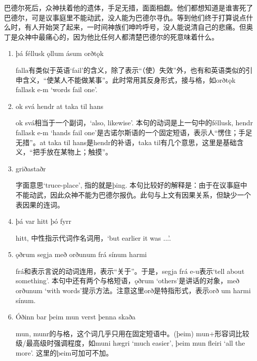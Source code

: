 \begin{translation*}{}
    巴德尔死后，众神扶着他的遗体，手足无措，面面相觑。他们都想知道是谁害死了巴德尔，可是议事庭里不能动武，没人能为巴德尔寻仇。等到他们终于打算说点什么时，有人开始哭了起来，一时间神族们呻吟呼号，没人能说清自己的悲痛。但奥丁是众神中最痛心的，因为他比任何人都清楚巴德尔的死意味着什么。
\end{translation*}
\begin{grammar*}{}
    \begin{enumerate}[leftmargin=*]
        \item þá féllusk ǫllum ásum orðtǫk

              falla有类似于英语`fail'的含义，除了表示“（使）失效”外，也有和英语类似的引申含义，“使某人不能做某事”。此时常用其反身形式，接与格，如orðtǫk fallask e-m `words fail one'.

        \item ok svá hendr at taka til hans

              ok svá相当于一个副词，`also, likewise'. 本句的动词是上一句中的féllusk, hendr fallask e-m `hands fail one'是古诺尔斯语的一个固定短语，表示人“愣住；手足无措”。at taka til hans是hendr的补语，taka til有几个意思，这里是基础含义，“把手放在某物上；触摸”。

        \item griðastaðr

              字面意思`truce-place', 指的就是þing. 本句比较好的解释是：由于在议事庭中不能动武，因此众神不能为巴德尔报仇。此句与上文有因果关系，但缺少一个表因果的连词。

        \item þá var hitt þó fyrr

              hitt, 中性指示代词作名词用，`but earlier it was ...'.

        \item ǫðrum segja með orðunum frá sínum harmi

              frá和表示言说的动词连用，表示“关于”。于是，segja frá e-u表示`tell about something'. 本句中还有两个与格短语，ǫðrum `others'是讲话的对象，með orðunum `with words'提示方法。注意这里orð是特指形式，表示orð um harmi sínum.

        \item Óðinn bar þeim mun verst þenna skaða

              mun, munr的与格，这个词几乎只用在固定短语中。(þeim) mun+形容词比较级/最高级时强调程度，如muni hægri `much easier', þeim mun fleiri `all the more'. 这里的þeim可加可不加。
    \end{enumerate}
\end{grammar*}

